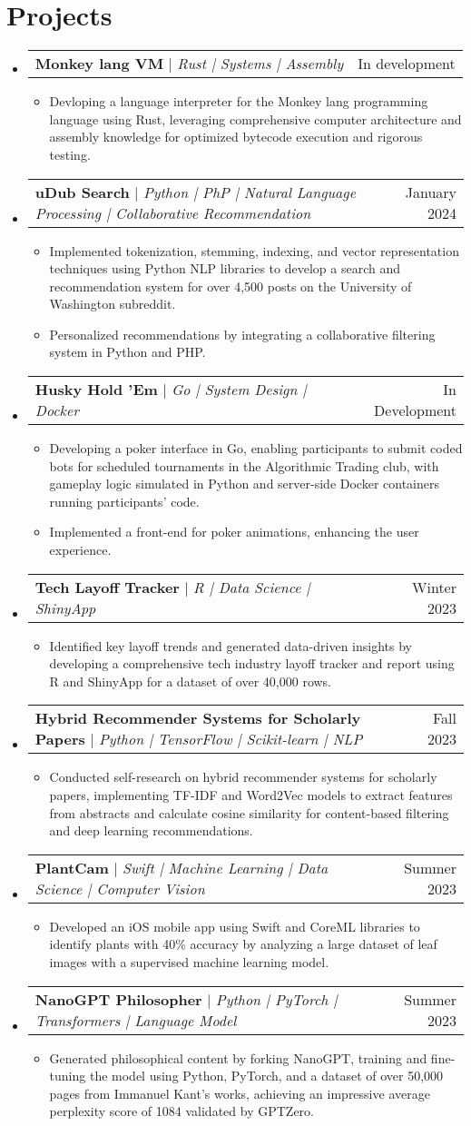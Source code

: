 \documentclass[letterpaper,11pt]{article}
\makeatletter
\newcommand{\resumeItem}[1]{
  \item\small{
    {#1 \vspace{-2pt}}
  }
}
\newcommand{\resumeProjectHeading}[2]{
    \item
    \begin{tabular*}{0.97\textwidth}{l@{\extracolsep{\fill}}r}
      \small#1 & #2 \\
    \end{tabular*}\vspace{-7pt}
}
\newcommand{\resumeSubHeadingListStart}{\begin{itemize}[leftmargin=0.15in, label={}]}
\newcommand{\resumeSubHeadingListEnd}{\end{itemize}}
\newcommand{\resumeItemListStart}{\begin{itemize}}
\newcommand{\resumeItemListEnd}{\end{itemize}\vspace{-5pt}}
\makeatother
\begin{document}
\section{Projects}
\resumeSubHeadingListStart
\resumeProjectHeading
{\textbf{Monkey lang VM} $|$ \emph{Rust | Systems | Assembly }}{In development}
\resumeItemListStart
\resumeItem{Devloping a language interpreter for the Monkey lang programming language using Rust, leveraging comprehensive computer architecture and assembly knowledge for optimized bytecode execution and rigorous testing.}
\resumeItemListEnd
\resumeProjectHeading
{\textbf{uDub Search} $|$ \emph{Python | PhP | Natural Language Processing | Collaborative Recommendation}}{January 2024}
\resumeItemListStart
\resumeItem{Implemented tokenization, stemming, indexing, and vector representation techniques using Python NLP libraries to develop a search and recommendation system for over 4,500 posts on the University of Washington subreddit.}
\resumeItem{Personalized recommendations by integrating a collaborative filtering system in Python and PHP.}
\resumeItemListEnd
\resumeProjectHeading
{\textbf{Husky Hold 'Em } $|$ \emph{Go | System Design | Docker}}{In Development}
\resumeItemListStart
\resumeItem{Developing a poker interface in Go, enabling participants to submit coded bots for scheduled tournaments in the Algorithmic Trading club, with gameplay logic simulated in Python and server-side Docker containers running participants' code.}
\resumeItem{Implemented a front-end for poker animations, enhancing the user experience.}
\resumeItemListEnd
\resumeProjectHeading
{\textbf{Tech Layoff Tracker} $|$ \emph{R | Data Science | ShinyApp}}{Winter 2023}
\resumeItemListStart
\resumeItem{Identified key layoff trends and generated data-driven insights by developing a comprehensive tech industry layoff tracker and report using R and ShinyApp for a dataset of over 40,000 rows.}
\resumeItemListEnd

\resumeProjectHeading
{\textbf{Hybrid Recommender Systems for Scholarly Papers} $|$ \emph{Python | TensorFlow | Scikit-learn | NLP}}{Fall 2023}
\resumeItemListStart
\resumeItem{Conducted self-research on hybrid recommender systems for scholarly papers, implementing TF-IDF and Word2Vec models to extract features from abstracts and calculate cosine similarity for content-based filtering and deep learning recommendations.}
\resumeItemListEnd
\resumeProjectHeading
{\textbf{PlantCam} $|$ \emph{Swift | Machine Learning | Data Science | Computer Vision}}{Summer 2023}
\resumeItemListStart
\resumeItem{Developed an iOS mobile app using Swift and CoreML libraries to identify plants with 40\% accuracy by analyzing a large dataset of leaf images with a supervised machine learning model.}
\resumeItemListEnd
\resumeProjectHeading
{\textbf{NanoGPT Philosopher} $|$ \emph{Python | PyTorch | Transformers | Language Model}}{Summer 2023}
\resumeItemListStart
\resumeItem{Generated philosophical content by forking NanoGPT, training and fine-tuning the model using Python, PyTorch, and a dataset of over 50,000 pages from Immanuel Kant's works, achieving an impressive average perplexity score of 1084 validated by GPTZero.}
\resumeItemListEnd
\resumeSubHeadingListEnd
\end{document}

